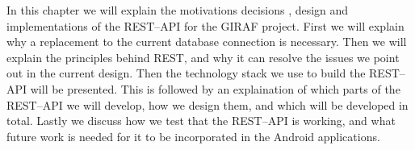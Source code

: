 In this chapter we will explain the motivations decisions , design and implementations of the REST--API for the GIRAF project. 
First we will explain why a replacement to the current database connection is necessary.
Then we will explain the principles behind REST, and why it can resolve the issues we point out in the current design.
Then the technology stack we use to build the REST--API will be presented.
This is followed by an explaination of which parts of the REST--API we will develop, how we design them, and which will be developed in total.
Lastly we discuss how we test that the REST--API is working, and what future work is needed for it to be incorporated in the Android applications.

